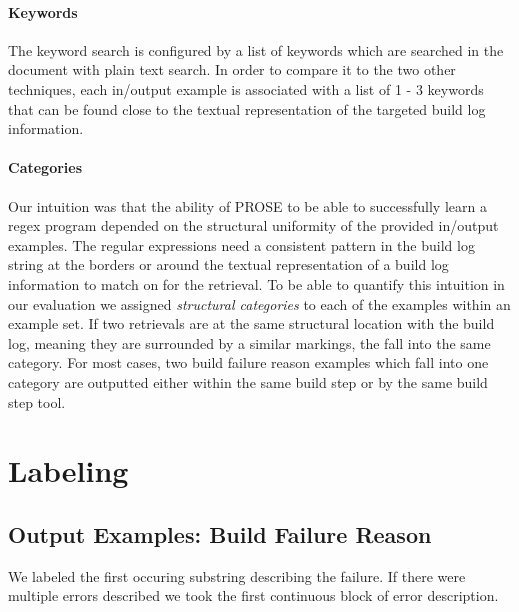 \documentclass[\myrootdir/main.tex]{subfiles}
\begin{document}
\paragraph{Keywords}
The keyword search is configured by a list of keywords which are searched in the document with plain text search.
In order to compare it to the two other techniques, each in/output example is associated with a list of 1 - 3 keywords that can be found close to the textual representation of the targeted build log information.



\paragraph{Categories}
Our intuition was that the ability of PROSE to be able to successfully learn a regex program depended on the structural uniformity of the provided in/output examples.
The regular expressions need a consistent pattern in the build log string at the borders or around the textual representation of a build log information to match on for the retrieval.
To be able to quantify this intuition in our evaluation we assigned \emph{structural categories} to each of the examples within an example set.
If two retrievals are at the same structural location with the build log, meaning they are surrounded by a similar markings, the fall into the same category.
For most cases, two build failure reason examples which fall into one category are outputted either within the same build step or by the same build step tool.

\section{Labeling}
\subsection*{Output Examples: Build Failure Reason}
We labeled the first occuring substring describing the failure.
If there were multiple errors described we took the first continuous block of error description.
\end{document}
